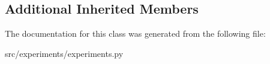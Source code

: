 \subsection*{Additional Inherited Members}


The documentation for this class was generated from the following file\+:\begin{DoxyCompactItemize}
\item 
src/experiments/experiments.\+py\end{DoxyCompactItemize}
